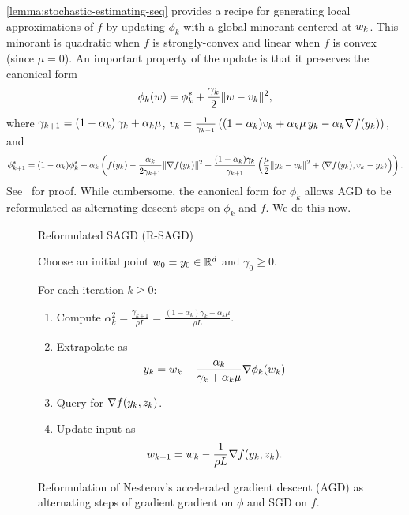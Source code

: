 \autoref{lemma:stochastic-estimating-seq} provides a recipe for generating local approximations of \( f \) by updating \( \phi_k \) with a global minorant centered at \( w_k \). 
This minorant is quadratic when \( f \) is strongly-convex and linear when \( f \) is convex (since \( \mu = 0 \)).
An important property of the update is that it preserves the canonical form
\begin{align*}
    \phi_k(w) = \phi_k^* + \frac{\gamma_k}{2}\|w - v_k\|^2,
\end{align*}
where \( \gamma_{k+1} = \left(1 - \alpha_{k}\right)\gamma_k + \alpha_{k} \mu \), \( v_k = \frac{1}{\gamma_{k+1}} \left((1-\alpha_{k})v_k + \alpha_{k} \mu \, y_k - \alpha_{k} \nabla f(y_k)\right), \) and 
\[ \phi^*_{k+1} = (1 - \alpha_{k}) \phi^*_k + \alpha_{k}\left(f(y_k) - \frac{\alpha_{k}}{2 \gamma_{k+1}} \|\nabla f(y_k)\|^2 + \frac{(1 - \alpha_{k})\gamma_k}{\gamma_{k+1}}\left(\frac{\mu}{2}\|y_k - v_k\|^2 + \left\langle\nabla f(y_k), v_k - y_k\right\rangle\right)\right). \]
See~\citet[Lemma 2.2.3]{nesterov2004lectures} for proof.
While cumbersome, the canonical form for \( \phi_k \) allows AGD to be reformulated as alternating descent steps on \( \phi_k \) and \( f \).
We do this now.

\begin{figure}[t]
    \centering
    \begin{procedure}{Reformulated SAGD (R-SAGD)}
        \item Choose an initial point \( w_0 = y_0 \in \mathbb{R}^d \) and \( \gamma_0 \geq 0 \).
        \item For each iteration \( k \geq 0 \):
            \begin{enumerate}
                \item Compute 
                    \( \alpha^2_k = \frac{\gamma_{k+1}}{\rho L } = \frac{(1-\alpha_k)\gamma_k + \alpha_k \mu}{\rho L} \).
                \item Extrapolate as
                    \[ y_k = w_k - \frac{\alpha_k}{\gamma_k + \alpha_k \mu} \nabla \phi_k(w_k) \]

                \item Query \oracle{} for \( \nabla f(y_k, z_{k}) \). 
                \item Update input as\vspace{-1ex}%
                    \[ w_{k+1} = w_k - \frac{1}{\rho L} \nabla f(y_k, z_{k}). \]
            \end{enumerate}
    \end{procedure}
    \caption{Reformulation of Nesterov's accelerated gradient descent (AGD) as alternating steps of gradient gradient on \( \phi \) and SGD on \( f \).}%
    \label{procedure:reformulated-agd}
\end{figure}

